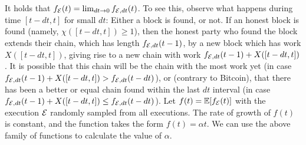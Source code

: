 It holds that $f_{\mathcal{E}}(t) = \lim_{dt \to 0}{f_{\mathcal{E},dt}(t)}$.
To see this, observe what happens during time $[t - dt, t]$ for small $dt$:
Either a block is found, or not.
If an honest block is found (namely, $\chi([t - dt, t]) \geq 1$), then the honest party who found the block
extends their chain, which has length $f_{\mathcal{E},dt}(t - 1)$, by a new block
which has work $X([t - dt, t])$, giving rise to a new chain with work $f_{\mathcal{E},dt}(t - 1) + X([t - dt, t])$.
It is possible that this chain will be the chain with
the most work yet (in case $f_{\mathcal{E},dt}(t - 1) + X([t - dt, t]) > f_{\mathcal{E},dt}(t - dt)$),
or (contrary to Bitcoin), that there has been a better or equal chain found within the last $dt$ interval
(in case $f_{\mathcal{E},dt}(t - 1) + X([t - dt, t]) \leq f_{\mathcal{E},dt}(t - dt)$).
Let $f(t) = \mathop{{}\mathbb{E}}[f_{\mathcal{E}}(t)]$ with the execution $\mathcal{E}$ randomly sampled from all executions.
The rate of growth of $f(t)$ is constant, and the function takes the form $f(t) = \alpha t$.
We can use the above family of functions to calculate the value of $\alpha$.

